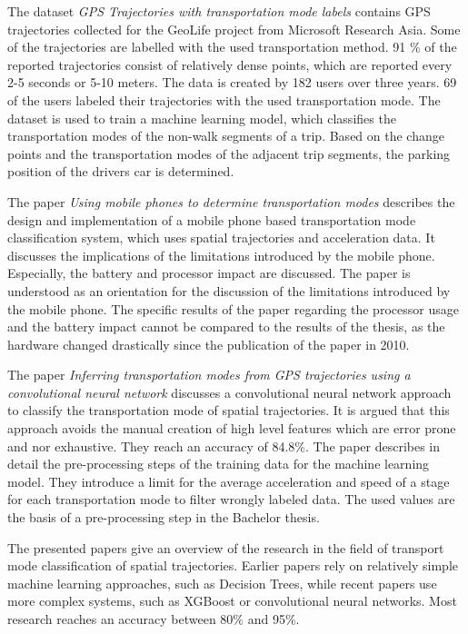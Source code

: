 The dataset \textit{GPS Trajectories with transportation mode labels} \cite{geolife-dataset}\cite{zheng2009mining}\cite{zheng2008understanding}\cite{zheng2010geolife} contains GPS trajectories collected for the GeoLife project from Microsoft Research Asia. Some of the trajectories are labelled with the used transportation method. 91 \% of the reported trajectories consist of relatively dense points, which are reported every 2-5 seconds or 5-10 meters. The data is created by 182 users over three years. 69 of the users labeled their trajectories with the used transportation mode. \newline
The dataset is used to train a machine learning model, which classifies the transportation modes of the non-walk segments of a trip. Based on the change points and the transportation modes of the adjacent trip segments, the parking position of the drivers car is determined. 


The paper \textit{Using mobile phones to determine transportation modes} \cite{Reddy2010} describes the design and implementation of a mobile phone based transportation mode classification system, which uses spatial trajectories and acceleration data. It discusses the implications of the limitations introduced by the mobile phone. Especially, the battery and processor impact are discussed.
The paper is understood as an orientation for the discussion of the limitations introduced by the mobile phone. The specific results of the paper regarding the processor usage and the battery impact cannot be compared to the results of the thesis, as the hardware changed drastically since the publication of the paper in 2010.

The paper \textit{Inferring transportation modes from GPS trajectories using a convolutional neural network} \cite{Dabiri2018} discusses a convolutional neural network approach to classify the transportation mode of spatial trajectories. It is argued that this approach avoids the manual creation of high level features which are error prone and nor exhaustive. They reach an accuracy of 84.8\%.\newline
The paper describes in detail the pre-processing steps of the training data for the machine learning model. They introduce a limit for the average acceleration and speed of a stage for each transportation mode to filter wrongly labeled data. The used values are the basis of a pre-processing step in the Bachelor thesis.

The presented papers give an overview of the research in the field of transport mode classification of spatial trajectories. Earlier papers rely on relatively simple machine learning approaches, such as Decision Trees, while recent papers use more complex systems, such as XGBoost or convolutional neural networks. Most research reaches an accuracy between 80\% and 95\%. \cite{Zheng2008} \cite{Xiao2017} \cite{Dabiri2018}